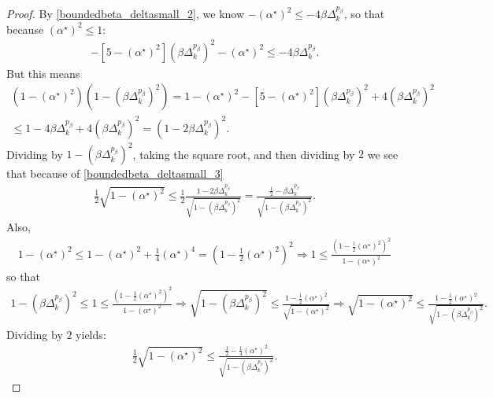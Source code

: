 \documentclass{article}
\theoremstyle{case}
\newcommand{\dk}{\Delta_k}
\newcommand{\minanglealpha}{{ \alpha^{\star} }}
\begin{document}
\begin{proof}
By \cref{boundedbeta_deltasmall_2}, we know $-\left(\minanglealpha\right)^2 \le -4\beta\dk^{p_{\beta}}$,
so that because $\left(\minanglealpha\right)^2 \le 1$:
\begin{align*}
-\left[5- \left(\minanglealpha\right)^2\right]\left(\beta\dk^{p_{\beta}}\right)^2  - \left(\minanglealpha\right)^2 \le -4\beta\dk^{p_{\beta}}.
\end{align*}
But this means
\begin{align*}
\left(1 - \left(\minanglealpha\right)^2\right)\left(1 - \left(\beta\dk^{p_{\beta}}\right)^2\right) 
= 1 - \left(\minanglealpha\right)^2 - \left[5 - \left(\minanglealpha\right)^2\right]\left(\beta\dk^{p_{\beta}}\right)^2 + 4\left(\beta\dk^{p_{\beta}}\right)^2 \\
\le 1 - 4\beta\dk^{p_{\beta}} + 4\left(\beta\dk^{p_{\beta}}\right)^2 = \left(1 - 2\beta\dk^{p_{\beta}}\right)^2.
\end{align*}
Dividing by $1 - \left(\beta\dk^{p_{\beta}}\right)^2$, taking the square root, and then dividing by $2$ we see that because of \cref{boundedbeta_deltasmall_3}
\begin{align} \frac 1 2 \sqrt{1 - \left(\minanglealpha\right)^2} \le \frac 1 2 \frac{1 -2\beta\dk^{p_{\beta}}}{\sqrt{1 - \left(\beta\dk^{p_{\beta}}\right)^2}}
= \frac{\frac 1 2 -\beta\dk^{p_{\beta}}}{\sqrt{1 - \left(\beta\dk^{p_{\beta}}\right)^2}}. \label{boundedbeta_eqn1}
\end{align}
Also,
\begin{align*}
1 - \left(\minanglealpha\right)^2 \le 1 - \left(\minanglealpha\right)^2 + \frac 1 4 \left(\minanglealpha\right)^4 
= \left(1 - \frac 1 2 \left(\minanglealpha\right)^2\right)^2 
\Longrightarrow 1 \le \frac{\left(1 - \frac 1 2 \left(\minanglealpha\right)^2\right)^2}{1 - \left(\minanglealpha\right)^2}
\end{align*}
so that
\begin{align*}
1 - \left(\beta\dk^{p_{\beta}}\right)^2 \le 1 \le \frac{\left(1 - \frac 1 2 \left(\minanglealpha\right)^2\right)^2}{1 - \left(\minanglealpha\right)^2} 
\Longrightarrow \sqrt{1 - \left(\beta\dk^{p_{\beta}}\right)^2}\le \frac{1 - \frac 1 2 \left(\minanglealpha\right)^2}{\sqrt{1 - \left(\minanglealpha\right)^2} } 
\Longrightarrow \sqrt{1 - \left(\minanglealpha\right)^2} \le \frac{1 - \frac 1 2 \left(\minanglealpha\right)^2}{\sqrt{1 - \left(\beta\dk^{p_{\beta}}\right)^2}}.
\end{align*}
Dividing by $2$ yields:
\begin{align}
\frac 1 2 \sqrt{1 - \left(\minanglealpha\right)^2} \le \frac{\frac 1 2 - \frac 1 4 \left(\minanglealpha\right)^2}{\sqrt{1 - \left(\beta\dk^{p_{\beta}}\right)^2}}
\label{boundedbeta_eqn2}.
\end{align}


\end{proof}
\end{document}

